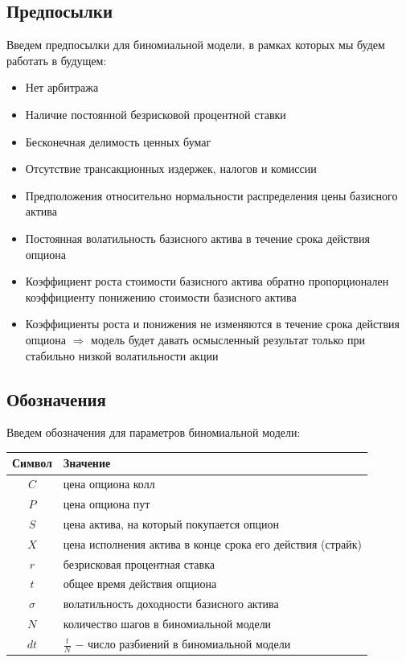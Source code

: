 \documentclass[a4paper, 12pt]{extarticle}
\begin{document}
	\subsection{Предпосылки}
	Введем предпосылки для биномиальной модели, в рамках которых мы будем работать в будущем:
	\begin{itemize}
		\item Нет арбитража
		\item Наличие постоянной безрисковой процентной ставки
		\item Бесконечная делимость ценных бумаг
		\item Отсутствие трансакционных издержек, налогов и комиссии
		\item Предположения относительно нормальности распределения цены базисного актива
		\item Постоянная волатильность базисного актива в течение срока действия опциона
		\item Коэффициент роста стоимости базисного актива обратно пропорционален коэффициенту понижению стоимости базисного актива
		\item Коэффициенты роста и понижения не изменяются в течение срока действия опциона $\Rightarrow$ модель будет давать осмысленный результат только при стабильно низкой волатильности акции
	\end{itemize}
	\subsection{Обозначения}
	Введем обозначения для параметров биномиальной модели:
	\begin{center}
		\begin{tabular}{|c|l|}
			\hline
			\textbf{Символ} & \textbf{Значение} \\
			\hline
			$C$ & цена опциона колл \\
			$P$ & цена опциона пут \\	
			$S$ & цена актива, на который покупается опцион \\
			$X$ & цена исполнения актива в конце срока его действия (страйк) \\
			$r$ & безрисковая процентная ставка \\
			$t$ & общее время действия опциона \\
			$\sigma$ & волатильность доходности базисного актива \\
			$N$ & количество шагов в биномиальной модели \\
			$dt$ & $\frac{t}{N}$ $-$ число разбиений в биномиальной модели \\
			\hline
		\end{tabular}
	\end{center}
	
\end{document}
